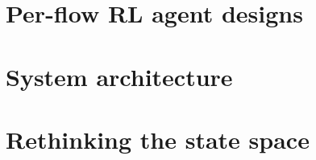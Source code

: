 
%



\section{Per-flow RL agent designs}\label{sec:ddos-mitigation-with-per-flow-reinforcement-learning}


\section{System architecture}\label{sec:ddos-architecture}


\section{Rethinking the state space}\label{sec:rethinking-the-state-space}



